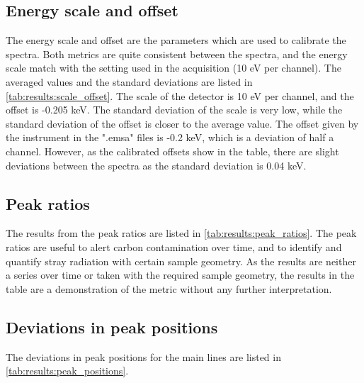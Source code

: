 


\subsection*{Energy scale and offset}
\label{results:setup:scale_offset}

The energy scale and offset are the parameters which are used to calibrate the spectra.
Both metrics are quite consistent between the spectra, and the energy scale match with the setting used in the acquisition (10 eV per channel).
The averaged values and the standard deviations are listed in \cref{tab:results:scale_offset}.
The scale of the detector is 10 eV per channel, and the offset is -0.205 keV.
The standard deviation of the scale is very low, while the standard deviation of the offset is closer to the average value.
The offset given by the instrument in the ".emsa" files is -0.2 keV, which is a deviation of half a channel.
However, as the calibrated offsets show in the table, there are slight deviations between the spectra as the standard deviation is 0.04 keV.





\subsection*{Peak ratios}
\label{results:setup:peak_ratios}

The results from the peak ratios are listed in \cref{tab:results:peak_ratios}.
The peak ratios are useful to alert carbon contamination over time, and to identify and quantify stray radiation with certain sample geometry.
As the results are neither a series over time or taken with the required sample geometry, the results in the table are a demonstration of the metric without any further interpretation.







\subsection*{Deviations in peak positions}
\label{results:setup:peak_positions}

The deviations in peak positions for the main lines are listed in \cref{tab:results:peak_positions}.



